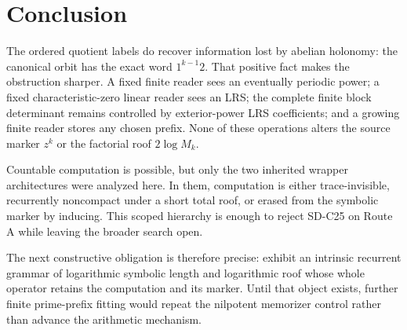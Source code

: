 \section{Conclusion}
\label{sec:conclusion}

The ordered quotient labels do recover information lost by abelian
holonomy: the canonical orbit has the exact word $1^{k-1}2$.  That positive
fact makes the obstruction sharper.  A fixed finite reader sees an
eventually periodic power; a fixed characteristic-zero linear reader sees
an LRS; the complete finite block determinant remains controlled by
exterior-power LRS coefficients; and a growing finite reader stores any
chosen prefix.  None of these operations alters the source marker $z^k$ or
the factorial roof $2\log M_k$.

Countable computation is possible, but only the two inherited wrapper
architectures were analyzed here.  In them, computation is either
trace-invisible, recurrently noncompact under a short total roof, or erased
from the symbolic marker by inducing.  This scoped hierarchy is enough to
reject SD-C25 on Route A while leaving the broader search open.

The next constructive obligation is therefore precise: exhibit an
intrinsic recurrent grammar of logarithmic symbolic length and logarithmic
roof whose whole operator retains the computation and its marker.  Until
that object exists, further finite prime-prefix fitting would repeat the
nilpotent memorizer control rather than advance the arithmetic mechanism.
